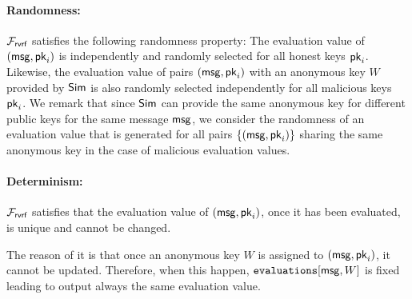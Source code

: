 	\paragraph{Randomness:} $ \mathcal{F}_{\textsf{rvrf}} $  satisfies the following randomness property: The evaluation value of $ (\mathsf{msg}, \mathsf{pk}_i) $ is independently and randomly selected for all honest keys $\mathsf{pk}_i$.
	Likewise, the evaluation value of pairs ${(\mathsf{msg}, \mathsf{pk}_i)}$ with an anonymous key $W$ provided by $\mathsf{Sim}$ is also randomly selected independently for all malicious keys $\mathsf{pk}_i$.  We remark that since $ \mathsf{Sim} $ can provide the same anonymous key for different public keys for the same message $ \mathsf{msg} $, we consider the randomness of an evaluation value that is generated for all pairs $ \{(\mathsf{msg}, \mathsf{pk}_i)\} $ sharing the same anonymous key in the case of malicious evaluation values.
	
	
	
	
	
	
	\paragraph{Determinism:} $ \mathcal{F}_{\textsf{rvrf}} $  satisfies that the evaluation value  of $ (\mathsf{msg}, \mathsf{pk}_i) $, once it has been evaluated, is unique and  cannot be changed. 
	
	The reason of it is that once an anonymous key $ W $ is assigned to $ (\mathsf{msg}, \mathsf{pk}_i) $, it cannot be updated. Therefore, when this happen, $ \texttt{evaluations}[\mathsf{msg}, W] $ is fixed leading to output always the same evaluation value.
	
